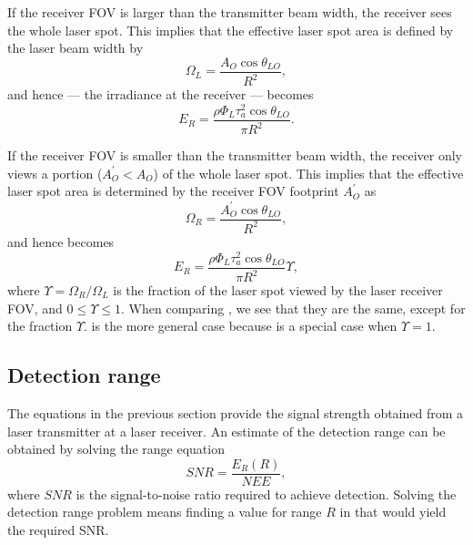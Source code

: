 If the receiver FOV  is larger than the transmitter beam width, the receiver sees the whole laser spot. This implies that the effective laser spot area is defined by the laser beam width by
\begin{equation}
\Omega_L=\frac{A_O\cos\theta_{LO}}{R^2},
\end{equation}
and hence  --- the irradiance at the receiver ---  becomes
\begin{equation}
E_R = \frac{
\rho \Phi_L \tau^2_{a} \cos\theta_{LO}}{\pi R^2 }\label{lrfi1}.
\end{equation}

If the receiver FOV is smaller than the transmitter beam width, the receiver only views a portion ($A_O^\prime<A_O$) of the whole laser spot. This implies that the effective laser spot area is determined by the receiver FOV footprint  $A_O^\prime$ as 
\begin{equation}
\Omega_R=\frac{A_O^\prime\cos\theta_{LO}}{R^2},
\label{eq:lrfFOVsmaller}
\end{equation}
and hence  becomes
\begin{equation}
E_R = \frac{
\rho \Phi_L \tau^2_{a} \cos\theta_{LO}}{\pi R^2 }\Upsilon , %
\label{lrfi2}
\end{equation}
where $\Upsilon =\Omega_R/\Omega_L$ is the fraction of the laser spot
viewed by the laser receiver FOV, and $0\leq\Upsilon\leq 1$. When comparing
, we see that they are the same, except
for the fraction $\Upsilon$.  is the more general case
because  is a special case when $\Upsilon=1$.

\subsection{Detection range}
\noindent
The equations in the previous section provide the signal strength obtained from a laser transmitter at a laser receiver. An estimate of the detection range can be obtained by solving the range equation
\begin{equation}
SNR=\frac{E_R(R)}{NEE},
\label{eq:laserdetectionsnrerror}
\end{equation}
where $SNR$ is the signal-to-noise ratio required to achieve detection. Solving the detection range problem means finding a value for range $R$ in  that would yield the required SNR. 


